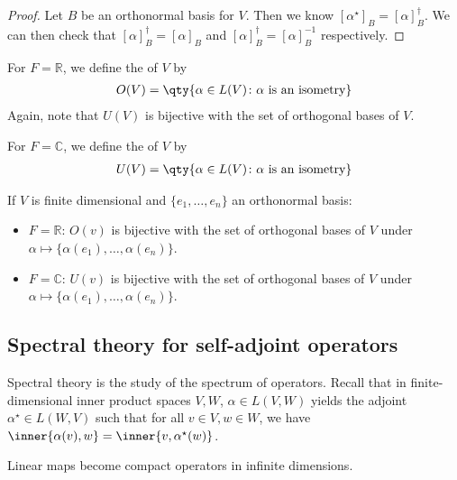 \begin{proof}
	Let $B$ be an orthonormal basis for $V$.
	Then we know $[\alpha^\star]_B = [\alpha]_B^\dagger$.
	We can then check that $[\alpha]_B^\dagger = [\alpha]_B$ and $[\alpha]_B^\dagger = [\alpha]_B^{-1}$ respectively.
\end{proof}

\begin{definition}
	For $F = \mathbb R$, we define the  of $V$ by
	\begin{align*}
		O(V) = \qty{ \alpha \in L(V) \colon \alpha \text{ is an isometry} }
	\end{align*}
	Again, note that $U(V)$ is bijective with the set of orthogonal bases of $V$.
\end{definition}

\begin{definition}
	For $F = \mathbb C$, we define the  of $V$ by
	\begin{align*}
		U(V) = \qty{ \alpha \in L(V) \colon \alpha \text{ is an isometry} }
	\end{align*}
\end{definition} 

\begin{remark}
	If $V$ is finite dimensional and $\{e_1, \dots, e_n\}$ an orthonormal basis:
	\begin{itemize}
		\item $F = \mathbb{R}$: $O(v)$ is bijective with the set of orthogonal bases of $V$ under $\alpha \mapsto \{\alpha(e_1), \dots, \alpha(e_n)\}$.
		\item $F = \mathbb{C}$: $U(v)$ is bijective with the set of orthogonal bases of $V$ under $\alpha \mapsto \{\alpha(e_1), \dots, \alpha(e_n)\}$.
	\end{itemize} 
\end{remark} 

\subsection{Spectral theory for self-adjoint operators}
Spectral theory is the study of the spectrum of operators.
Recall that in finite-dimensional inner product spaces $V, W$, $\alpha \in L(V, W)$ yields the adjoint $\alpha^\star \in L(W, V)$ such that for all $v \in V, w \in W$, we have $\inner{\alpha(v), w} = \inner{v, \alpha^\star(w)}$.

Linear maps become compact operators in infinite dimensions.

